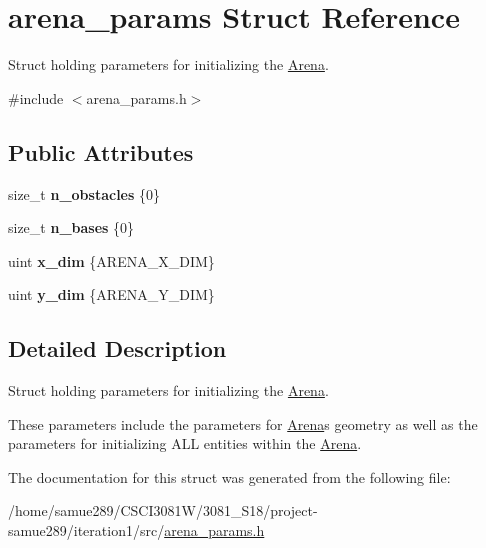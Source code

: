 \hypertarget{structarena__params}{}\section{arena\+\_\+params Struct Reference}
\label{structarena__params}


Struct holding parameters for initializing the \hyperlink{classArena}{Arena}.  




{\ttfamily \#include $<$arena\+\_\+params.\+h$>$}

\subsection*{Public Attributes}
\begin{DoxyCompactItemize}
\item 
size\+\_\+t {\bfseries n\+\_\+obstacles} \{0\}\hypertarget{structarena__params_a41015e200424ec7ef1f86eaf0ce99dd0}{}\label{structarena__params_a41015e200424ec7ef1f86eaf0ce99dd0}

\item 
size\+\_\+t {\bfseries n\+\_\+bases} \{0\}\hypertarget{structarena__params_a8eeebe0f71b12f8ad67319a97aec7daf}{}\label{structarena__params_a8eeebe0f71b12f8ad67319a97aec7daf}

\item 
uint {\bfseries x\+\_\+dim} \{A\+R\+E\+N\+A\+\_\+\+X\+\_\+\+D\+IM\}\hypertarget{structarena__params_afa86b434ed8ea5a4fe9ae14ae1438e8f}{}\label{structarena__params_afa86b434ed8ea5a4fe9ae14ae1438e8f}

\item 
uint {\bfseries y\+\_\+dim} \{A\+R\+E\+N\+A\+\_\+\+Y\+\_\+\+D\+IM\}\hypertarget{structarena__params_ab5d50b9affa9c753c15e1d6f088824af}{}\label{structarena__params_ab5d50b9affa9c753c15e1d6f088824af}

\end{DoxyCompactItemize}


\subsection{Detailed Description}
Struct holding parameters for initializing the \hyperlink{classArena}{Arena}. 

These parameters include the parameters for \hyperlink{classArena}{Arena}\textquotesingle{}s geometry as well as the parameters for initializing A\+LL entities within the \hyperlink{classArena}{Arena}. 

The documentation for this struct was generated from the following file\+:\begin{DoxyCompactItemize}
\item 
/home/samue289/\+C\+S\+C\+I3081\+W/3081\+\_\+\+S18/project-\/samue289/iteration1/src/\hyperlink{arena__params_8h}{arena\+\_\+params.\+h}\end{DoxyCompactItemize}
